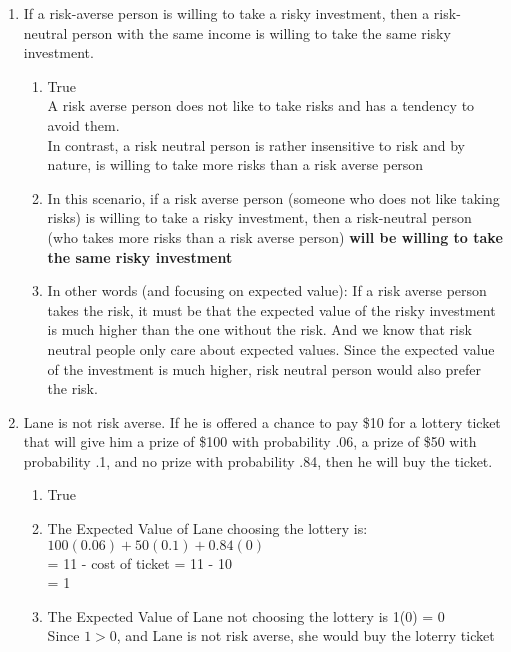 \documentclass[11pt]{article}
\begin{document}
\begin{enumerate}
\begin{enumerate}
    \item If a risk-averse person is willing to take a risky investment, then a risk-neutral person with the same income is willing to take the same risky investment.
        \begin{enumerate}
            \item True\\
            A risk averse person does not like to take risks and has a tendency to avoid them. \\In contrast, a risk neutral person is rather insensitive to risk and by nature, is willing to take more risks than a risk averse person
            \item In this scenario, if a risk averse person (someone who does not like taking risks) is willing to take a risky investment, then a risk-neutral person (who takes more risks than a risk averse person) \textbf{will be willing to take the same risky investment}
            \item In other words (and focusing on expected value): If a risk averse person takes the risk, it must be that the expected value of the risky investment is much higher than the one without the risk. And we know that risk neutral people only care about expected values. Since the expected value of the investment is much higher, risk neutral person would also prefer the risk.
        \end{enumerate}

    \item Lane is not risk averse. If he is offered a chance to pay \$10 for a lottery ticket that will give him a prize of \$100 with probability .06, a prize of \$50 with probability .1, and no prize with probability .84, then he will buy the ticket.
        \begin{enumerate}
            \item True\\
            \item The Expected Value of Lane choosing the lottery is: \\
            $100 (0.06) + 50(0.1) + 0.84(0)$\\
            = 11 - cost of ticket = 11 - 10\\
            = 1 
            \item The Expected Value of Lane not choosing the lottery is 1(0) = 0 \\
            Since $1 > 0$, and Lane is not risk averse, she would buy the loterry ticket
        \end{enumerate}


\end{enumerate}
\end{enumerate}
\end{document}
